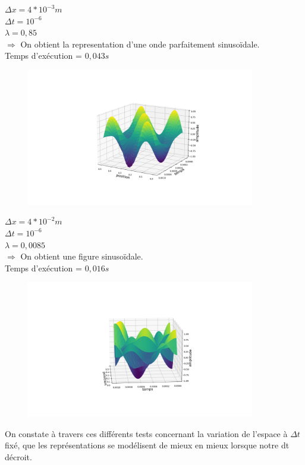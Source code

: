 \begin{enumerate}[label=\alph*)]

\begin{minipage}{.45\textwidth}%

\item $\Delta x=4*{10}^{-3}m$ \\
$\Delta t= {10}^{-6}$ \\
$\lambda= 0,85$\\


$\Longrightarrow$ On obtient la representation d'une onde parfaitement sinusoïdale.\\
Temps d'exécution = $0,043s$

\end{minipage}%
\hfill
\begin{minipage}{.6\textwidth}%
\includegraphics[width=12cm,height=6cm]{dt=10^-6 et dx=0.004.png}

\end{minipage}%
\newline
\begin{minipage}{.45\textwidth}%
\item $\Delta x=4*{10}^{-2}m$ \\
$\Delta t= {10}^{-6}$ \\
$\lambda= 0,0085$\\


$\Longrightarrow$ On obtient une figure sinusoïdale.\\
Temps d'exécution = $0,016s$

\end{minipage}%
\begin{minipage}{.45\textwidth}%
\includegraphics[width=12cm,height=6cm]{dt=10^-6 avec dx=0.04.png}

\end{minipage}%

On constate à travers ces différents tests concernant la variation de l'espace à $\Delta t$ fixé, que les représentations se modélisent de mieux en mieux lorsque notre dt décroit.


\end{enumerate}
